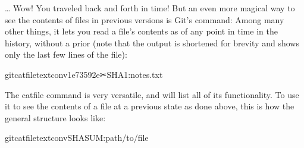 \sphinxAtStartPar
… Wow! You traveled back and forth in time!
But an even more magical way to see the contents of files in previous
versions is Git’s  command: Among many other things, it lets
you read a file’s contents as of any point in time in the history, without a
prior  (note that the output is shortened for brevity and shows only the last few lines of the file):

\begin{sphinxVerbatim}[commandchars=\\\{\}]
gitcat\PYGZhy{}file\PYGZhy{}\PYGZhy{}textconv1e73592e✂SHA1:notes.txt


\end{sphinxVerbatim}

\ignorespaces 
\sphinxAtStartPar
The cat\sphinxhyphen{}file command is very versatile, and
 will list all
of its functionality. To use it to see the contents of a file at a previous
state as done above, this is how the general structure looks like:

\begin{sphinxVerbatim}[commandchars=\\\{\}]
gitcat\PYGZhy{}file\PYGZhy{}\PYGZhy{}textconvSHASUM:\PYGZlt{}path/to/file\PYGZgt{}
\end{sphinxVerbatim}


